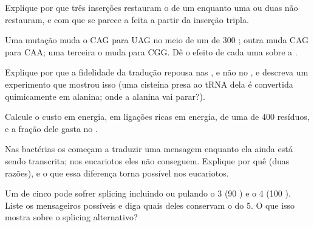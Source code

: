 \begin{exercise}[$\star\star$]\label{exo:b1:gene-expression:6}
Explique por que três inserções restauram o  de um 
enquanto uma ou duas não restauram, e com que se parece a  feita
a partir da inserção tripla.
\end{exercise}

\begin{exercise}[$\star\star$]\label{exo:b1:gene-expression:7}
Uma mutação muda o  CAG para UAG no meio de um  de \qty{300}{}
; outra muda CAG para CAA; uma terceira o muda para CGG. Dê o
efeito de cada uma sobre a .
\end{exercise}

\begin{exercise}[$\star\star$]\label{exo:b1:gene-expression:8}
Explique por que a fidelidade da tradução repousa nas
, e não no , e descreva um experimento
que mostrou isso (uma cisteína presa ao tRNA dela é convertida
quimicamente em alanina; onde a alanina vai parar?).
\end{exercise}

\begin{exercise}[$\star\star$]\label{exo:b1:gene-expression:9}
Calcule o custo em energia, em ligações ricas em energia, de uma
 de \qty{400}{} resíduos, e a fração dele gasta no .
\end{exercise}

\begin{exercise}[$\star\star\star$]\label{exo:b1:gene-expression:10}
Nas bactérias os  começam a traduzir uma mensagem enquanto ela
ainda está sendo transcrita; nos eucariotos eles não conseguem. Explique
por quê (duas razões), e o que essa diferença torna possível nos
eucariotos.
\end{exercise}

\begin{exercise}[$\star\star\star$]\label{exo:b1:gene-expression:11}
Um  de cinco  pode sofrer splicing incluindo ou pulando o 
3 (\qty{90}{} ) e o  4 (\qty{100}{} ). Liste
os mensageiros possíveis e diga quais deles conservam o  do  5. O que isso mostra sobre o splicing alternativo?
\end{exercise}


